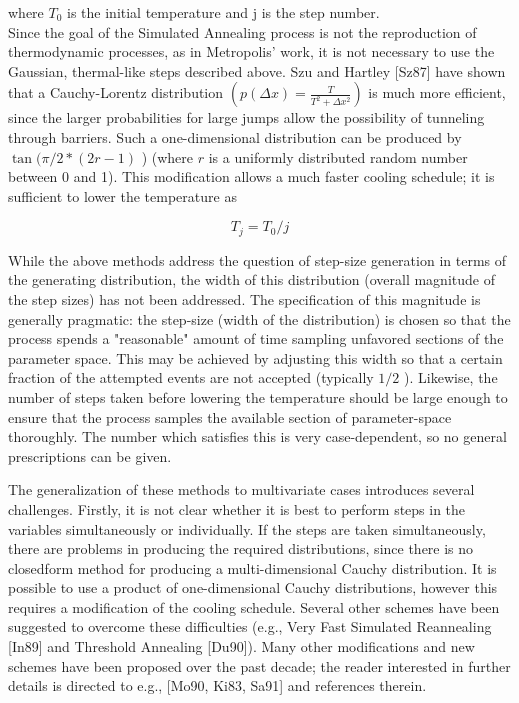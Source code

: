 \documentclass[10pt]{article}
\begin{document}
where $T_{0}$ is the initial temperature and j is the step number.\\[0pt]
Since the goal of the Simulated Annealing process is not the reproduction of thermodynamic processes, as in Metropolis' work, it is not necessary to use the Gaussian, thermal-like steps described above. Szu and Hartley [Sz87] have shown that a Cauchy-Lorentz distribution $\left(p(\Delta x)=\frac{T}{T^{2}+\Delta x^{2}}\right)$ is much more efficient, since the larger probabilities for large jumps allow the possibility of tunneling through barriers. Such a one-dimensional distribution can be produced by $\tan (\pi / 2 *(2 r-1)$ ) (where $r$ is a uniformly distributed random number between 0 and 1). This modification allows a much faster cooling schedule; it is sufficient to lower the temperature as


\begin{equation*}
T_{j}=T_{0} / j \tag{13.2}
\end{equation*}


While the above methods address the question of step-size generation in terms of the generating distribution, the width of this distribution (overall magnitude of the step sizes) has not been addressed. The specification of this magnitude is generally pragmatic: the step-size (width of the distribution) is chosen so that the process spends a "reasonable" amount of time sampling unfavored sections of the parameter space. This may be achieved by adjusting this width so that a certain fraction of the attempted events are not accepted (typically $1 / 2$ ). Likewise, the number of steps taken before lowering the temperature should be large enough to ensure that the process samples the available section of parameter-space thoroughly. The number which satisfies this is very case-dependent, so no general prescriptions can be given.

The generalization of these methods to multivariate cases introduces several challenges. Firstly, it is not clear whether it is best to perform steps in the variables simultaneously or individually. If the steps are taken simultaneously, there are problems in producing the required distributions, since there is no closedform method for producing a multi-dimensional Cauchy distribution. It is possible to use a product of one-dimensional Cauchy distributions, however this requires a modification of the cooling schedule. Several other schemes have been suggested to overcome these difficulties (e.g., Very Fast Simulated Reannealing [In89] and Threshold Annealing [Du90]). Many other modifications and new schemes have been proposed over the past decade; the reader interested in further details is directed to e.g., [Mo90, Ki83, Sa91] and references therein.
\end{document}
